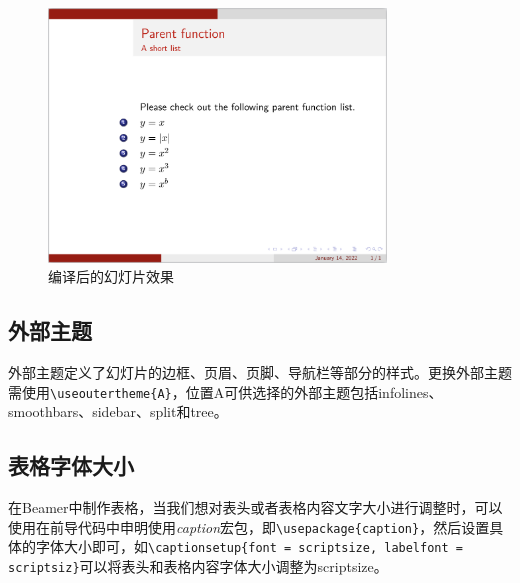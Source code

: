\begin{figure}[htbp]
    \centering
    \includegraphics[width = 0.8\textwidth]{images/ch_9/example_innertheme_inmargin.png}
    \caption{编译后的幻灯片效果}
    \label{fig:931}
\end{figure}

\subsection{外部主题}

外部主题定义了幻灯片的边框、页眉、页脚、导航栏等部分的样式。更换外部主题需使用\texttt{\textbackslash{}useoutertheme\{A\}}，位置A可供选择的外部主题包括infolines、smoothbars、sidebar、split和tree。

\subsection{表格字体大小}

在Beamer中制作表格，当我们想对表头或者表格内容文字大小进行调整时，可以使用在前导代码中申明使用\emph{caption}宏包，即\texttt{\textbackslash{}usepackage\{caption\}}，然后设置具体的字体大小即可，如\texttt{\textbackslash{}captionsetup\{font = scriptsize, labelfont = scriptsiz\}}可以将表头和表格内容字体大小调整为scriptsize。

